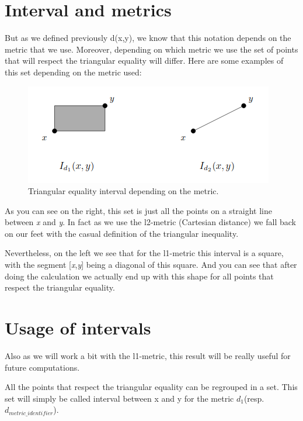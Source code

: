 \section{Interval and metrics} %
	But as we defined previously d(x,y), we know that this notation depends on the metric that we use. Moreover, depending on which metric we use the set of points that will respect the triangular equality will differ. Here are some examples of this set depending on the metric used:
\begin{figure}[H]
  \includegraphics[width=\linewidth]{img/interval_example.png}
  \caption{Triangular equality interval depending on the metric.}
  \label{fig:interval_example}
\end{figure}

As you can see on the right, this set is just all the points on a straight line between \emph{x} and \emph{y}. In fact as we use the l2-metric (Cartesian distance) we fall back on our feet with the casual definition of the triangular inequality.

Nevertheless, on the left we see that for the l1-metric this interval is a square, with the segment [\emph{x},\emph{y}] being a diagonal of this square. And you can see that after doing the calculation we actually end up with this shape for all points that respect the triangular equality.

\section{Usage of intervals} %
Also as we will work a bit with the l1-metric, this result will be really useful for future computations.\newline

All the points that respect the triangular equality can be regrouped in a set. This set will simply be called interval between x and y for the metric $d_1$(resp. $d_{metric\_identifier}$).

